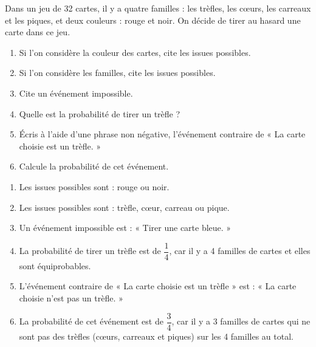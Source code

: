 \begin{exercice*}
    Dans un jeu de 32 cartes, il y a quatre familles : les trèfles, les cœurs, les carreaux et les piques, et deux couleurs : rouge et noir. On décide de tirer au hasard une carte dans ce jeu.

    \begin{enumerate}
        \item Si l'on considère la couleur des cartes, cite les issues possibles.
        \item Si l'on considère les familles, cite les issues possibles.
        \item Cite un événement impossible.
        \item Quelle est la probabilité de tirer un trèfle ?
        \item Écris à l'aide d'une phrase non négative, l'événement contraire de « La carte choisie est un trèfle. »
        \item Calcule la probabilité de cet événement.
    \end{enumerate}
\end{exercice*}
\begin{corrige}
    \begin{enumerate}
        \item Les issues possibles sont : rouge ou noir.
        \item Les issues possibles sont : trèfle, cœur, carreau ou pique.
        \item Un événement impossible est : « Tirer une carte bleue. »
        \item La probabilité de tirer un trèfle est de $\dfrac{1}{4}$, car il y a 4 familles de cartes et elles sont équiprobables.
        \item L'événement contraire de « La carte choisie est un trèfle » est : « La carte choisie n'est pas un trèfle. »
        \item La probabilité de cet événement est de $\dfrac{3}{4}$, car il y a 3 familles de cartes qui ne sont pas des trèfles (cœurs, carreaux et piques) sur les 4 familles au total.
    \end{enumerate}
\end{corrige}

